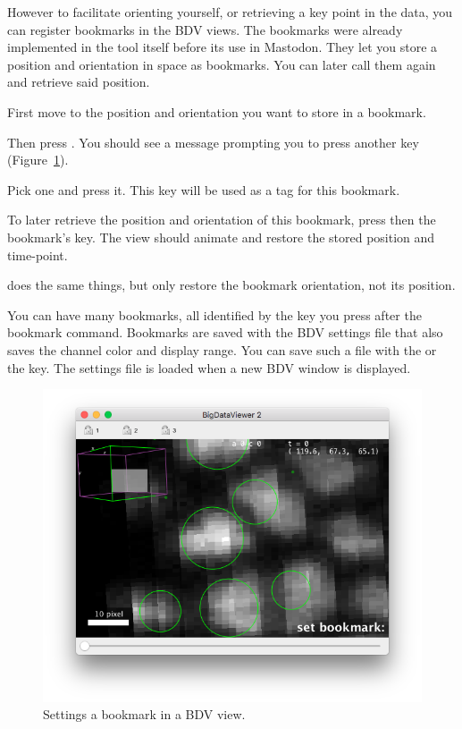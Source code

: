 However to facilitate orienting yourself, or retrieving a key point in the data, you can register bookmarks in the BDV views. 
The bookmarks were already implemented in the \bdv tool itself before its use in Mastodon.
They let you store a position and orientation in space as bookmarks. 
You can later call them again and retrieve said position. 
\begin{myitemize}
    \item First move to the position and orientation you want to store in a bookmark.
    \item Then press . You should see a message prompting you to press another key (Figure~\ref{fig:BDVSettingBookmark}).
    \item Pick one and press it. This key will be used as a tag for this bookmark.
    \item To later retrieve the position and orientation of this bookmark, press  then the bookmark's key. The view should animate and restore the stored position and time-point.
    \item {} does the same things, but only restore the bookmark orientation, not its position.
\end{myitemize}

You can have many bookmarks, all identified by the key you press after the bookmark command.
Bookmarks are saved with the BDV settings file that also saves the channel color and display range.
You can save such a file with the  or the  key.
The settings file is loaded when a new BDV window is displayed.

\begin{figure}
    \centering
    \includegraphics[height=0.27\textheight]{figures/Mastodon_SettingBookmark.png}
    
    \caption{Settings a bookmark in a BDV view.  }
    \label{fig:BDVSettingBookmark}
\end{figure}


